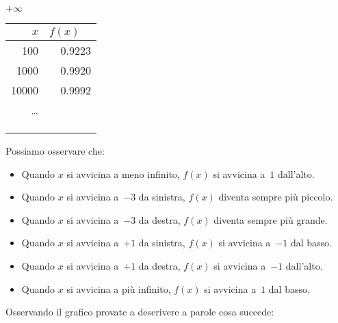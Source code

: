 \begin{esempio}
\begin{minipage}{.24\textwidth}
\begin{center}
\(+\infty\)\\
\begin{tabular}{r|r}
\(x\) & \(f(x)\quad\)\\\hline
100 & 0.9223 \\
1000 & 0.9920 \\
10000 & 0.9992 \\
\dots \\
&\\
&\\
&
\end{tabular}
\end{center}
\end{minipage}
Possiamo osservare che:
\begin{itemize} [nosep]
 \item Quando \(x\) si avvicina a meno infinito, 
\(f(x)\) si avvicina a~\(1\) dall'alto.
 \item Quando \(x\) si avvicina a~\(-3\) da sinistra, 
\(f(x)\) diventa sempre più piccolo.
 \item Quando \(x\) si avvicina a~\(-3\) da destra, 
\(f(x)\) diventa sempre più grande.
 \item Quando \(x\) si avvicina a~\(+1\) da sinistra, 
\(f(x)\)  si avvicina a~\(-1\) dal basso.
 \item Quando \(x\) si avvicina a~\(+1\) da destra, 
\(f(x)\)  si avvicina a~\(-1\) dall'alto.
 \item Quando \(x\) si avvicina a più infinito, 
\(f(x)\) si avvicina a~\(1\) dal basso.
\end{itemize}
\begin{center}\scalebox{.6}{\limitigraficoa}\end{center}
\end{esempio}

Osservando il grafico provate a descrivere a parole cosa succede:

